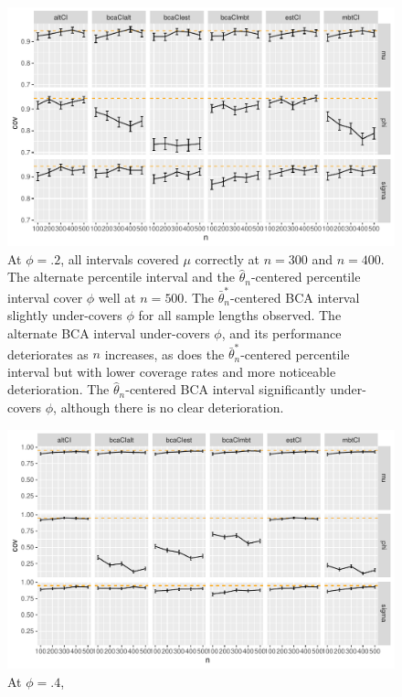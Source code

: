 \documentclass[12pt, letterpaper, titlepage]{article}
\begin{document}
\begin{figure}[tbp]
\caption{}
  \centering
  \includegraphics[width=\textwidth]{figures/plot_.2}
  \caption{At $\phi = .2$, all intervals covered $\mu$ correctly at $n = 300$ and $n = 400$. The alternate percentile interval and the $\hat{\theta}_{n}$-centered percentile interval cover $\phi$ well at $n = 500$. The $\bar\theta_n^*$-centered BCA interval slightly under-covers $\phi$ for all sample lengths observed. The alternate BCA interval under-covers $\phi$, and its performance deteriorates as $n$ increases, as does the $\bar\theta_n^*$-centered percentile interval but with lower coverage rates and more noticeable deterioration. The $\hat{\theta}_{n}$-centered BCA interval significantly under-covers $\phi$, although there is no clear deterioration.}
  \label{fig:plot_.2}
\end{figure}

\begin{figure}[tbp]
\caption{}
  \centering
  \includegraphics[width=\textwidth]{figures/plot_.4}
  \caption{At $\phi = .4$,}
  \label{fig:plot_.4}
\end{figure}
\end{document}
